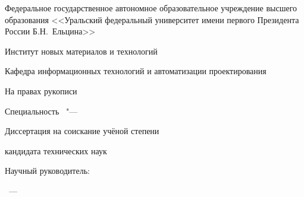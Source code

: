 \thispagestyle{empty}

\begin{center}
Федеральное государственное автономное образовательное учреждение высшего образования
<<Уральский федеральный университет
имени первого Президента России Б.Н.~Ельцина>>

Институт новых материалов и технологий

Кафедра информационных технологий и автоматизации проектирования
\end{center}
%
\vspace{0pt plus4fill} %
\begin{flushright}
На правах рукописи

\end{flushright}
%
\vspace{0pt plus6fill} %
\begin{center}
{\large
\theseAuthor}
\end{center}
%
\vspace{0pt plus1fill} %
\begin{center}
\textbf {\large %
\theseTitle}

\vspace{0pt plus2fill} %
{%
Специальность
\theseCode\ "---

\theseCodeDesq
}

\vspace{0pt plus2fill} %
Диссертация на соискание учёной степени

кандидата технических наук
\end{center}
%
\vspace{0pt plus4fill} %
\begin{flushright}

Научный руководитель:

\theseSvRegalia

\theseSupervisor

\end{flushright}

\vspace{0pt plus4fill} %
{\centering
\theseCity~---
\theseYear
\par}

\clearpage
